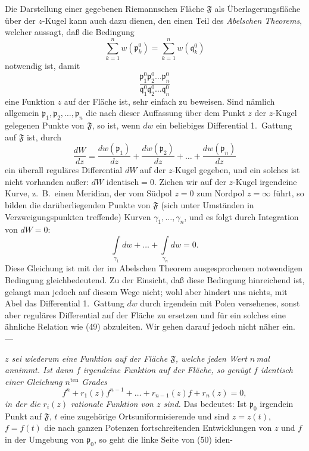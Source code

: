 \documentclass{article}
\begin{document}
Die Darstellung einer gegebenen Riemannschen Fläche $\mathfrak{F}$ als Überlagerungsfläche über der $z$-Kugel kann auch dazu dienen, den einen Teil des \emph{Abelschen Theorems}, welcher aussagt, daß die Bedingung
\[ \sum_{k=1}^n w(\mathfrak{p}_k^0) = \sum_{k=1}^n w(\mathfrak{q}_k^0) \]
notwendig ist, damit
\[ \frac{\mathfrak{p}_1^0 \mathfrak{p}_2^0 \dots \mathfrak{p}_n^0}{\mathfrak{q}_1^0 \mathfrak{q}_2^0 \dots \mathfrak{q}_n^0} \]
eine Funktion $z$ auf der Fläche ist, sehr einfach zu beweisen. Sind nämlich allgemein $\mathfrak{p}_1, \mathfrak{p}_2, \dots, \mathfrak{p}_n$ die nach dieser Auffassung über dem Punkt $z$ der $z$-Kugel gelegenen Punkte von $\mathfrak{F}$, so ist, wenn $dw$ ein beliebiges Differential 1.\ Gattung auf $\mathfrak{F}$ ist, durch
\[ \frac{dW}{dz} = \frac{dw(\mathfrak{p}_1)}{dz} + \frac{dw(\mathfrak{p}_2)}{dz} + \dots + \frac{dw(\mathfrak{p}_n)}{dz} \]
ein überall reguläres Differential $dW$ auf der $z$-Kugel gegeben, und ein solches ist nicht vorhanden außer: $dW \text{ identisch} = 0$. Ziehen wir auf der $z$-Kugel irgendeine Kurve, z.~B.\ einen Meridian, der vom Südpol $z = 0$ zum Nordpol $z = \infty$ führt, so bilden die darüberliegenden Punkte von $\mathfrak{F}$ (sich unter Umständen in Verzweigungspunkten treffende) Kurven $\gamma_1, \dots, \gamma_n$, und es folgt durch Integration von $dW = 0$:
\[ \int\limits_{\gamma_1} dw + \dots + \int\limits_{\gamma_n} dw = 0. \tag{49} \]
Diese Gleichung ist mit der im Abelschen Theorem ausgesprochenen notwendigen Bedingung gleichbedeutend. Zu der Einsicht, daß diese Bedingung hinreichend ist, gelangt man jedoch auf diesem Wege nicht; wohl aber hindert uns nichts, mit Abel das Differential 1.\ Gattung $dw$ durch irgendein mit Polen versehenes, sonst aber reguläres Differential auf der Fläche zu ersetzen und für ein solches eine ähnliche Relation wie (49) abzuleiten. Wir gehen darauf jedoch nicht näher ein. ---

\emph{$z$ sei wiederum eine Funktion auf der Fläche $\mathfrak{F}$, welche jeden Wert $n$\,mal annimmt. Ist dann $f$ irgendeine Funktion auf der Fläche, so genügt $f$ identisch einer Gleichung $n^{\text{ten}}$ Grades}
\[ f^n + r_1(z) f^{n-1} + \dots + r_{n-1}(z) f + r_n(z) = 0, \tag{50} \]
\emph{in der die $r_i(z)$ rationale Funktion von $z$ sind.} Das bedeutet: Ist $\mathfrak{p}_0$ irgendein Punkt auf $\mathfrak{F}$, $t$ eine zugehörige Ortsuniformisierende und sind $z = z(t)$, $f = f(t)$ die nach ganzen Potenzen fortschreitenden Entwicklungen von $z$ und $f$ in der Umgebung von $\mathfrak{p}_0$, so geht die linke Seite von (50) iden-
\end{document}
